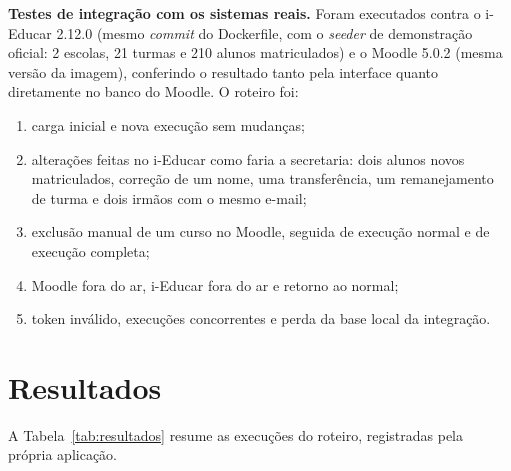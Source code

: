 \documentclass[12pt]{article}
\begin{document}
\textbf{Testes de integração com os sistemas reais.} Foram executados contra o
i-Educar 2.12.0 (mesmo \emph{commit} do Dockerfile, com o \emph{seeder} de
demonstração oficial: 2 escolas, 21 turmas e 210 alunos matriculados) e o
Moodle 5.0.2 (mesma versão da imagem), conferindo o resultado tanto pela
interface quanto diretamente no banco do Moodle. O roteiro foi:
\begin{enumerate}
  \item carga inicial e nova execução sem mudanças;
  \item alterações feitas no i-Educar como faria a secretaria: dois alunos novos
    matriculados, correção de um nome, uma transferência, um remanejamento de
    turma e dois irmãos com o mesmo e-mail;
  \item exclusão manual de um curso no Moodle, seguida de execução normal e de
    execução completa;
  \item Moodle fora do ar, i-Educar fora do ar e retorno ao normal;
  \item token inválido, execuções concorrentes e perda da base local da
    integração.
\end{enumerate}

\section{Resultados}

A Tabela~\ref{tab:resultados} resume as execuções do roteiro, registradas pela
própria aplicação.
\end{document}
